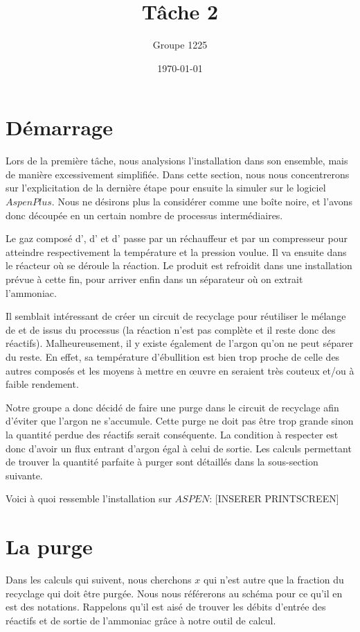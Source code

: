 \documentclass[a4paper, oneside, 12pt]{article}
\title{Tâche 2}
\author{Groupe 1225}
\date{\today}
\begin{document}
\maketitle

\section{Démarrage}

Lors de la première tâche, nous analysions l'installation dans son ensemble, 
mais de manière excessivement simplifiée. 
Dans cette section, nous nous concentrerons sur l'explicitation de la dernière étape 
pour ensuite la simuler sur le logiciel $Aspen Plus$. 
Nous ne désirons plus la considérer comme une boîte noire, et l'avons donc découpée 
en un certain nombre de processus intermédiaires. 

Le gaz composé d', d' et d' passe par un réchauffeur et par un compresseur 
pour atteindre respectivement la température et la pression voulue. 
Il va ensuite dans le réacteur où se déroule la réaction.
Le produit est refroidit dans une installation prévue à cette fin, 
pour arriver enfin dans un séparateur où on extrait l'ammoniac.

Il semblait intéressant de créer un circuit de recyclage pour réutiliser 
le mélange de  et de  issus du processus (la réaction n'est pas complète 
et il reste donc des réactifs). Malheureusement, il y existe également de l'argon 
qu'on ne peut séparer du reste. En effet, sa température d'ébullition est bien trop 
proche de celle des autres composés et les moyens à mettre en œuvre en seraient 
très couteux et/ou à faible rendement.

Notre groupe a donc décidé de faire une purge dans le circuit de recyclage 
afin d'éviter que l'argon ne s'accumule. Cette purge ne doit pas être trop grande 
sinon la quantité perdue des réactifs serait conséquente. 
La condition à respecter est donc d'avoir un flux entrant d'argon égal à celui de sortie. 
Les calculs permettant de trouver la quantité parfaite à purger 
sont détaillés dans la sous-section suivante.

Voici à quoi ressemble l'installation sur $ASPEN$:
[INSERER PRINTSCREEN]

\section{La purge}

Dans les calculs qui suivent, nous cherchons $x$ qui n'est autre que la fraction du recyclage 
qui doit être purgée. Nous nous référerons au schéma pour ce qu'il en est des notations. 
Rappelons qu'il est aisé de trouver les débits d'entrée des réactifs 
et de sortie de l'ammoniac grâce à notre outil de calcul.
\end{document}
